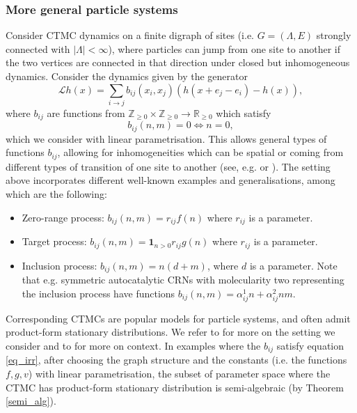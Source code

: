\documentclass{amsart}
\theoremstyle{definition}
\theoremstyle{remark}
\theoremstyle{Conjecture/open problem}
\theoremstyle{assumption}
\theoremstyle{conjecture}
\def\a{\alpha}
\def\1{\mathbf{1}}
\def\R{\mathbb{R}}
\def\Z{\mathbb{Z}}
\numberwithin{equation}{section}
\begin{document}
\subsubsection{More general particle systems}\label{more_gen_PS}
Consider CTMC dynamics on a finite digraph of sites (i.e. $G=(\Lambda,E)$ strongly connected with $|\Lambda|<\infty$), where particles can jump from one site to another if the two vertices are connected in that direction under closed but inhomogeneous dynamics. Consider the dynamics given by the generator 
$$\mathcal{L}h(x)=\sum_{i\to j} b_{ij}(x_i,x_j)(h(x+e_j-e_i)-h(x)),$$
where $b_{ij}$ are functions from $\Z_{\geq0}\times \Z_{\geq0}\to\R_{\geq 0}$ which satisfy \begin{equation}\label{eq_irr}
b_{ij}(n,m)=0\iff n=0,
\end{equation} which we consider with linear parametrisation. This allows general types of functions $b_{ij}$, allowing for inhomogeneities which can be spatial or coming from different types of transition of one site to another (see, e.g. \cite{hoesslysta} or \cite{Grossk_overv}). 
The setting above incorporates different well-known examples and generalisations, among which are the following:
\begin{itemize}
\item Zero-range process: $b_{ij}(n,m)=r_{ij}f(n)$ where $r_{ij}$ is a parameter.
\item Target process: $b_{ij}(n,m)=\1_{n>0}r_{ij}g(n)$ where $r_{ij}$ is a parameter.
\item Inclusion process: $b_{ij}(n,m)=n(d+m)$, where $d$ is a parameter. Note that e.g. symmetric autocatalytic CRNs \cite{hoesslysta} with molecularity two representing the inclusion process
have functions $b_{ij}(n,m)=\a_{ij}^1n+\a_{ij}^2nm$.
\end{itemize}
Corresponding CTMCs are popular models for particle systems, and often admit product-form stationary distributions. We refer to \cite{Grosskinsk_inhom,inclusion_proc,Grossk_overv} for more on the setting we consider and to \cite{kipnis1999sli,Evans1,Schadschn_cx,liggett} for more on context. 
In examples where the $b_{ij}$ satisfy equation \eqref{eq_irr}, after choosing the graph structure and the constants (i.e. the functions $f,g,v$) with linear parametrisation, the subset of parameter space where the CTMC has product-form stationary distribution is semi-algebraic (by Theorem \ref{semi_alg}).
\end{document}
